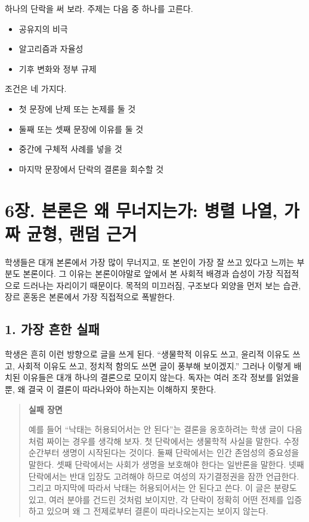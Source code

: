 하나의 단락을 써 보라. 주제는 다음 중 하나를 고른다.

\begin{itemize}
\tightlist
\item
  공유지의 비극
\item
  알고리즘과 자율성
\item
  기후 변화와 정부 규제
\end{itemize}

조건은 네 가지다.

\begin{itemize}
\tightlist
\item
  첫 문장에 난제 또는 논제를 둘 것
\item
  둘째 또는 셋째 문장에 이유를 둘 것
\item
  중간에 구체적 사례를 넣을 것
\item
  마지막 문장에서 단락의 결론을 회수할 것
\end{itemize}

\chapter{6장. 본론은 왜 무너지는가: 병렬 나열, 가짜 균형, 랜덤 근거}\label{6uxc7a5-uxbcf8uxb860uxc740-uxc65c-uxbb34uxb108uxc9c0uxb294uxac00-uxbcd1uxb82c-uxb098uxc5f4-uxac00uxc9dc-uxade0uxd615-uxb79cuxb364-uxadfcuxac70}

학생들은 대개 본론에서 가장 많이 무너지고, 또 본인이 가장 잘 쓰고 있다고 느끼는 부분도 본론이다. 그 이유는 본론이야말로 앞에서 본 사회적 배경과 습성이 가장 직접적으로 드러나는 자리이기 때문이다. 목적의 미끄러짐, 구조보다 외양을 먼저 보는 습관, 장르 혼동은 본론에서 가장 직접적으로 폭발한다.

\section{1. 가장 흔한 실패}\label{1-uxac00uxc7a5-uxd754uxd55c-uxc2e4uxd328}

학생은 흔히 이런 방향으로 글을 쓰게 된다. ``생물학적 이유도 쓰고, 윤리적 이유도 쓰고, 사회적 이유도 쓰고, 정치적 함의도 쓰면 글이 풍부해 보이겠지.'' 그러나 이렇게 배치된 이유들은 대개 하나의 결론으로 모이지 않는다. 독자는 여러 조각 정보를 읽었을 뿐, 왜 결국 이 결론이 따라나와야 하는지는 이해하지 못한다.

\begin{quote}
\textbf{실패 장면}

예를 들어 ``낙태는 허용되어서는 안 된다''는 결론을 옹호하려는 학생 글이 다음처럼 짜이는 경우를 생각해 보자. 첫 단락에서는 생물학적 사실을 말한다. 수정 순간부터 생명이 시작된다는 것이다. 둘째 단락에서는 인간 존엄성의 중요성을 말한다. 셋째 단락에서는 사회가 생명을 보호해야 한다는 일반론을 말한다. 넷째 단락에서는 반대 입장도 고려해야 하므로 여성의 자기결정권을 잠깐 언급한다. 그리고 마지막에 따라서 낙태는 허용되어서는 안 된다고 쓴다. 이 글은 분량도 있고, 여러 분야를 건드린 것처럼 보이지만, 각 단락이 정확히 어떤 전제를 입증하고 있으며 왜 그 전제로부터 결론이 따라나오는지는 보이지 않는다.
\end{quote}

